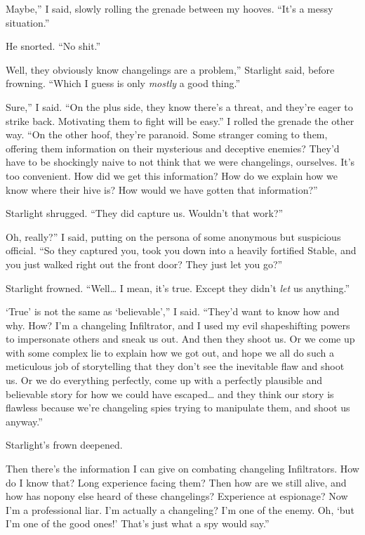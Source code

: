 \leavevmode{}Maybe,” I said, slowly rolling the grenade between my hooves. “It’s a messy situation.”

He snorted. “No shit.”

\leavevmode{}Well, they obviously know changelings are a problem,” Starlight said, before frowning. “Which I guess is only \textit{mostly} a good thing.”

\leavevmode{}Sure,” I said. “On the plus side, they know there’s a threat, and they’re eager to strike back. Motivating them to fight will be easy.” I rolled the grenade the other way. “On the other hoof, they’re paranoid. Some stranger coming to them, offering them information on their mysterious and deceptive enemies? They’d have to be shockingly naive to not think that we were changelings, ourselves. It’s too convenient. How did we get this information? How do we explain how we know where their hive is? How would we have gotten that information?”

Starlight shrugged. “They did capture us. Wouldn’t that work?”

\leavevmode{}Oh, really?” I said, putting on the persona of some anonymous but suspicious official. “So they captured you, took you down into a heavily fortified Stable, and you just walked right out the front door? They just let you go?”

Starlight frowned. “Well… I mean, it’s true. Except they didn’t \textit{let} us anything.”

\leavevmode{}‘True’ is not the same as ‘believable’,” I said. “They’d want to know how and why. How? I’m a changeling Infiltrator, and I used my evil shapeshifting powers to impersonate others and sneak us out. And then they shoot us. Or we come up with some complex lie to explain how we got out, and hope we all do such a meticulous job of storytelling that they don’t see the inevitable flaw and shoot us. Or we do everything perfectly, come up with a perfectly plausible and believable story for how we could have escaped… and they think our story is flawless because we’re changeling spies trying to manipulate them, and shoot us anyway.”

Starlight’s frown deepened.

\leavevmode{}Then there’s the information I can give on combating changeling Infiltrators. How do I know that? Long experience facing them? Then how are we still alive, and how has nopony else heard of these changelings? Experience at espionage? Now I’m a professional liar. I’m actually a changeling? I’m one of the enemy. Oh, ‘but I’m one of the good ones!’ That’s just what a spy would say.”

